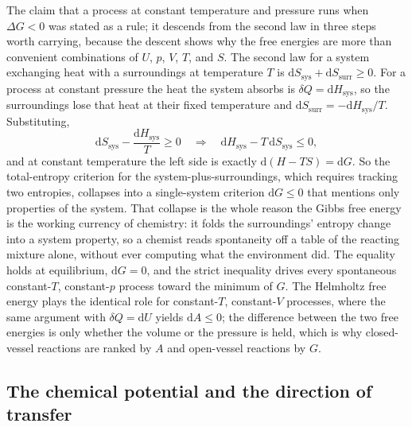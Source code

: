The claim that a process at constant temperature and pressure runs when
$\Delta G < 0$ was stated as a rule; it descends from the second law in three
steps worth carrying, because the descent shows why the free energies are more than
convenient combinations of $U$, $p$, $V$, $T$, and $S$. The second law for a system
exchanging heat with a surroundings at temperature $T$ is $\mathrm{d}S_{\text{sys}}
+ \mathrm{d}S_{\text{surr}} \geq 0$. For a process at constant pressure the heat the
system absorbs is $\delta Q = \mathrm{d}H_{\text{sys}}$, so the surroundings lose
that heat at their fixed temperature and $\mathrm{d}S_{\text{surr}} = -\mathrm{d}
H_{\text{sys}}/T$. Substituting,
\[
\mathrm{d}S_{\text{sys}} - \frac{\mathrm{d}H_{\text{sys}}}{T} \geq 0
\quad\Longrightarrow\quad
\mathrm{d}H_{\text{sys}} - T\,\mathrm{d}S_{\text{sys}} \leq 0,
\]
and at constant temperature the left side is exactly $\mathrm{d}(H - TS) =
\mathrm{d}G$. So the total-entropy criterion for the system-plus-surroundings, which
requires tracking two entropies, collapses into a single-system criterion
$\mathrm{d}G \leq 0$ that mentions only properties of the system. That collapse is
the whole reason the Gibbs free energy is the working currency of chemistry: it
folds the surroundings' entropy change into a system property, so a chemist reads
spontaneity off a table of the reacting mixture alone, without ever computing what
the environment did. The equality holds at equilibrium, $\mathrm{d}G = 0$, and the
strict inequality drives every spontaneous constant-$T$, constant-$p$ process toward
the minimum of $G$. The Helmholtz free energy plays the identical role for
constant-$T$, constant-$V$ processes, where the same argument with
$\delta Q = \mathrm{d}U$ yields $\mathrm{d}A \leq 0$; the difference between the two
free energies is only whether the volume or the pressure is held, which is why
closed-vessel reactions are ranked by $A$ and open-vessel reactions by $G$.

\subsection{The chemical potential and the direction of transfer}

